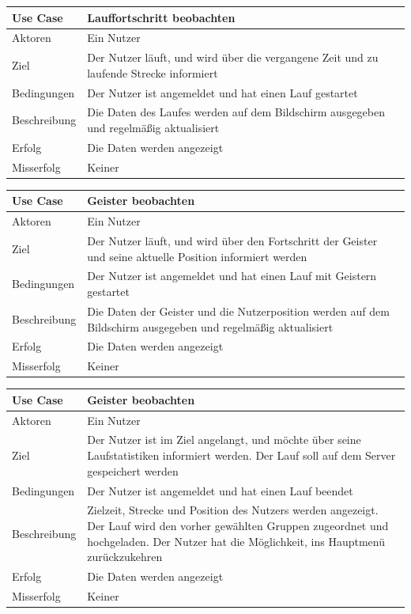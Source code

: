 \begin{tabular}{|p{}|p{}|}
\hline
\textbf{Use Case} & \textbf{Lauffortschritt beobachten} \\ \hline
Aktoren &  Ein Nutzer \\ \hline
Ziel &  Der Nutzer läuft, und wird über die vergangene Zeit und zu laufende Strecke informiert \\ \hline
Bedingungen &  Der Nutzer ist angemeldet und hat einen Lauf gestartet \\ \hline
Beschreibung & Die Daten des Laufes werden auf dem Bildschirm ausgegeben und regelmäßig aktualisiert \\ \hline
Erfolg & Die Daten werden angezeigt \\ \hline
Misserfolg & Keiner \\ \hline
\hline \end{tabular}
\begin{tabular}{|p{}|p{}|}
\hline
\textbf{Use Case} & \textbf{Geister beobachten} \\ \hline
Aktoren &  Ein Nutzer \\ \hline
Ziel &  Der Nutzer läuft, und wird über den Fortschritt der Geister und seine aktuelle Position informiert werden \\ \hline
Bedingungen &  Der Nutzer ist angemeldet und hat einen Lauf mit Geistern gestartet \\ \hline
Beschreibung & Die Daten der Geister und die Nutzerposition werden auf dem Bildschirm ausgegeben und regelmäßig aktualisiert \\ \hline
Erfolg & Die Daten werden angezeigt \\ \hline
Misserfolg & Keiner \\ \hline
\hline \end{tabular}
\begin{tabular}{|p{}|p{}|}
\hline
\textbf{Use Case} & \textbf{Geister beobachten} \\ \hline
Aktoren &  Ein Nutzer \\ \hline
Ziel &  Der Nutzer ist im Ziel angelangt, und möchte über seine Laufstatistiken informiert werden. Der Lauf soll auf dem Server gespeichert werden \\ \hline
Bedingungen &  Der Nutzer ist angemeldet und hat einen Lauf beendet \\ \hline
Beschreibung & Zielzeit, Strecke und Position des Nutzers werden angezeigt. Der Lauf wird den vorher gewählten Gruppen zugeordnet und hochgeladen. Der Nutzer hat die Möglichkeit, ins Hauptmenü zurückzukehren \\ \hline
Erfolg & Die Daten werden angezeigt \\ \hline
Misserfolg & Keiner \\ \hline
\hline \end{tabular}
